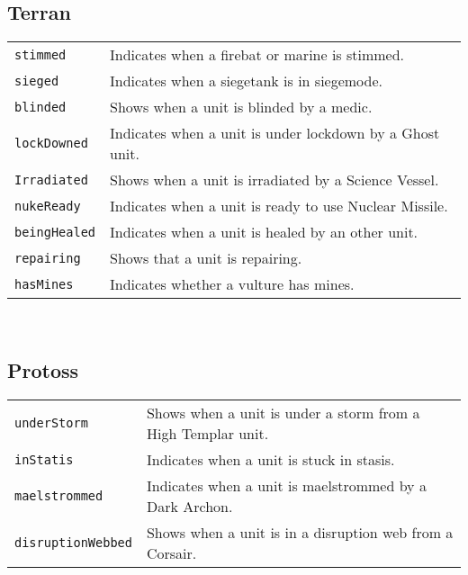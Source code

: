 \subsection{Terran}
\begin{tabularx}{\textwidth}{lX}
 \verb|stimmed| & Indicates when a firebat or marine is stimmed.\\
 \verb|sieged| & Indicates when a siegetank is in siegemode.\\
 \verb|blinded| & Shows when a unit is blinded by a medic. \\
 \verb|lockDowned| & Indicates when a unit is under lockdown by a Ghost unit. \\
 \verb|Irradiated| & Shows when a unit is irradiated by a Science Vessel. \\
 \verb|nukeReady| & Indicates when a unit is ready to use Nuclear Missile. \\
 \verb|beingHealed| & Indicates when a unit is healed by an other unit. \\
 \verb|repairing| & Shows that a unit is repairing. \\
 \verb|hasMines | & Indicates whether a vulture has mines.\\
\end{tabularx} \\

\subsection{Protoss}
\begin{tabularx}{\textwidth}{lX}
\verb|underStorm| & Shows when a unit is under a storm from a High Templar unit. \\
\verb|inStatis| & Indicates when a unit is stuck in stasis. \\
\verb|maelstrommed| & Indicates when a unit is maelstrommed by a Dark Archon. \\
\verb|disruptionWebbed| & Shows when a unit is in a disruption web from a Corsair. \\
\end{tabularx} \\
